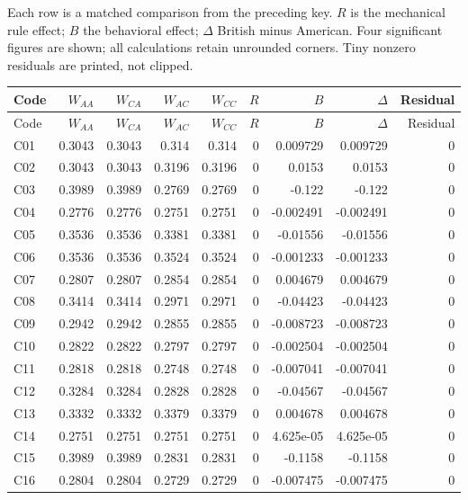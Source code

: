 \documentclass[10pt]{article}
\begin{document}
Each row is a matched comparison from the preceding key. $R$ is the mechanical rule effect; $B$ the behavioral effect; $\Delta$ British minus American. Four significant figures are shown; all calculations retain unrounded corners. Tiny nonzero residuals are printed, not clipped.\par\medskip
\small\setlength{\tabcolsep}{6pt}\begin{longtable}{@{}lrrrrrrrr@{}}
\toprule Code & $W_{AA}$ & $W_{CA}$ & $W_{AC}$ & $W_{CC}$ & $R$ & $B$ & $\Delta$ & Residual\\\midrule\endfirsthead
\toprule Code & $W_{AA}$ & $W_{CA}$ & $W_{AC}$ & $W_{CC}$ & $R$ & $B$ & $\Delta$ & Residual\\\midrule\endhead\bottomrule\endfoot
C01 & 0.3043 & 0.3043 & 0.314 & 0.314 & 0 & 0.009729 & 0.009729 & 0\\[1pt]
C02 & 0.3043 & 0.3043 & 0.3196 & 0.3196 & 0 & 0.0153 & 0.0153 & 0\\[1pt]
C03 & 0.3989 & 0.3989 & 0.2769 & 0.2769 & 0 & -0.122 & -0.122 & 0\\[1pt]
C04 & 0.2776 & 0.2776 & 0.2751 & 0.2751 & 0 & -0.002491 & -0.002491 & 0\\[1pt]
C05 & 0.3536 & 0.3536 & 0.3381 & 0.3381 & 0 & -0.01556 & -0.01556 & 0\\[1pt]
C06 & 0.3536 & 0.3536 & 0.3524 & 0.3524 & 0 & -0.001233 & -0.001233 & 0\\[1pt]
C07 & 0.2807 & 0.2807 & 0.2854 & 0.2854 & 0 & 0.004679 & 0.004679 & 0\\[1pt]
C08 & 0.3414 & 0.3414 & 0.2971 & 0.2971 & 0 & -0.04423 & -0.04423 & 0\\[1pt]
C09 & 0.2942 & 0.2942 & 0.2855 & 0.2855 & 0 & -0.008723 & -0.008723 & 0\\[1pt]
C10 & 0.2822 & 0.2822 & 0.2797 & 0.2797 & 0 & -0.002504 & -0.002504 & 0\\[1pt]
C11 & 0.2818 & 0.2818 & 0.2748 & 0.2748 & 0 & -0.007041 & -0.007041 & 0\\[1pt]
C12 & 0.3284 & 0.3284 & 0.2828 & 0.2828 & 0 & -0.04567 & -0.04567 & 0\\[1pt]
C13 & 0.3332 & 0.3332 & 0.3379 & 0.3379 & 0 & 0.004678 & 0.004678 & 0\\[1pt]
C14 & 0.2751 & 0.2751 & 0.2751 & 0.2751 & 0 & 4.625e-05 & 4.625e-05 & 0\\[1pt]
C15 & 0.3989 & 0.3989 & 0.2831 & 0.2831 & 0 & -0.1158 & -0.1158 & 0\\[1pt]
C16 & 0.2804 & 0.2804 & 0.2729 & 0.2729 & 0 & -0.007475 & -0.007475 & 0\\[1pt]

\end{longtable}
\end{document}

